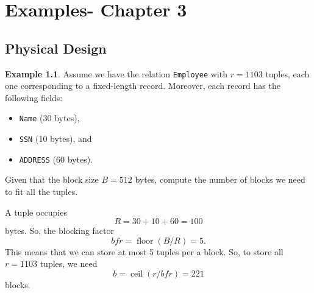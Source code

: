 \documentclass[a4paper, openany]{memoir}
\theoremstyle{definition}
\newtheorem{example}[subsection]{Example}
\begin{document}
\chapter{Examples- Chapter 3}
\section{Physical Design}
\begin{example}
    Assume we have the relation \texttt{Employee} with $r = 1103$ tuples, each one corresponding to a fixed-length record. Moreover, each record has the following fields:
    \begin{itemize}
        \item \texttt{Name} (30 bytes),
        \item \texttt{SSN} (10 bytes), and
        \item \texttt{ADDRESS} (60 bytes).
    \end{itemize}
    Given that the block size $B = 512$ bytes, compute the number of blocks we need to fit all the tuples.
\end{example}
\begin{answer}
    A tuple occupies
    \[R = 30 + 10 + 60 = 100\]
    bytes. So, the blocking factor
    \[\textit{bfr} = \operatorname{floor}(B/R) = 5.\]
    This means that we can store at most 5 tuples per a block. So, to store all $r = 1103$ tuples, we need
    \[b = \operatorname{ceil}(r/\textit{bfr}) = 221\]
    blocks.
\end{answer}
\end{document}
